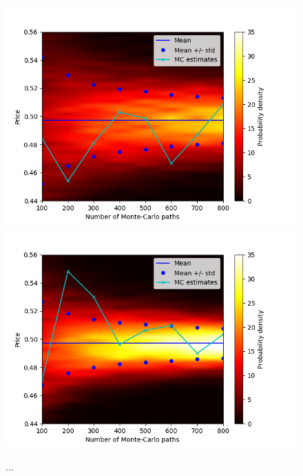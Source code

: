 
\begin{figure}
\centering
\includegraphics[scale=0.7]{figures/density_3d_ZCBond_False.png}
\includegraphics[scale=0.7]{figures/density_3d_ZCBond_True.png}
\caption{...}
\end{figure}

